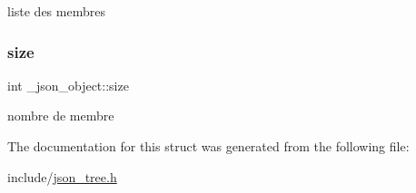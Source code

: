 liste des membres \mbox{\label{struct__json__object_a9a4c68b8224ec222391597f4e27ea447}} 
\subsubsection{\texorpdfstring{size}{size}}
{\footnotesize\ttfamily int \+\_\+json\+\_\+object\+::size}

nombre de membre 

The documentation for this struct was generated from the following file\+:\begin{DoxyCompactItemize}
\item 
include/\hyperlink{json__tree_8h}{json\+\_\+tree.\+h}\end{DoxyCompactItemize}
